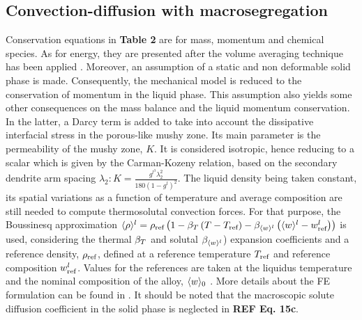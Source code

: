 \subsection{Convection-diffusion with macrosegregation}
Conservation equations in \textbf{Table 2} are for mass, momentum and chemical species. 
As for energy, they are presented after the volume averaging technique has been applied 
\cite{ni_volume-averaged_1991} \cite{dantzig_solidification_2009}. Moreover, an assumption 
of a static and non deformable solid phase is made. Consequently, the mechanical model is 
reduced to the conservation of momentum in the liquid phase. This assumption also yields 
some other consequences on the mass balance and the liquid momentum conservation. In the 
latter, a Darcy term is added to take into account the dissipative interfacial stress in 
the porous-like mushy zone. Its main parameter is the permeability of the mushy zone, $K$. 
It is considered isotropic, hence reducing to a scalar which is given by the Carman-Kozeny 
relation, based on the secondary dendrite arm spacing $\lambda_2: K= \frac{g^{l^3}  \lambda_2^{2}
 }{180\left ( 1-g^l \right )^2}$. The liquid density being taken constant, its spatial variations 
as a function of temperature and average composition are still needed to compute thermosolutal 
convection forces. For that purpose, the Boussinesq approximation $\langle  \rho  \rangle^l = \rho_{\text{ref}} \left( 1-\beta_T 
\left( T-T_{\text{ref}} \right)-\beta_{\langle w \rangle^l} \left( \langle w \rangle^l-w_{\text{ref}}^l \right) \right)$ is used, considering the thermal $\beta_T$ and solutal $\beta_{\langle w \rangle^l}$) expansion coefficients 
and a reference density, $\rho_{\text{ref}}$, defined at a reference temperature $T_{\text{ref}}$ and reference 
composition $w_{\text{ref}}^l$. Values for the references are taken at the liquidus temperature and the nominal 
composition of the alloy, $\langle w \rangle_0$ \cite{carozzani_direct_2013}. More details about the FE formulation can be found in 
\cite{rivaux_simulation_2011, carozzani_developpement_2012}. It should be noted that the macroscopic 
solute diffusion coefficient in the solid phase is neglected in \textbf{REF Eq. 15c}. 


